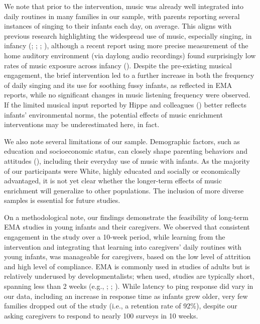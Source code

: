 \documentclass[
]{article}
\begin{document}
We note that prior to the intervention, music was already well
integrated into daily routines in many families in our sample, with
parents reporting several instances of singing to their infants each
day, on average. This aligns with previous research highlighting the
widespread use of music, especially singing, in infancy
(;
;
;
), although a recent report using
more precise measurement of the home auditory environment (via daylong
audio recordings) found surprisingly low rates of music exposure across
infancy (). Despite the
pre-existing musical engagement, the brief intervention led to a further
increase in both the frequency of daily singing and its use for soothing
fussy infants, as reflected in EMA reports, while no significant changes
in music listening frequency were observed. If the limited musical input
reported by Hippe and colleagues () better
reflects infants' environmental norms, the potential effects of music
enrichment interventions may be underestimated here, in fact.

We also note several limitations of our sample. Demographic factors,
such as education and socioeconomic status, can closely shape parenting
behaviors and attitudes (), including their everyday use of music with infants. As the
majority of our participants were White, highly educated and socially or
economically advantaged, it is not yet clear whether the longer-term
effects of music enrichment will generalize to other populations. The
inclusion of more diverse samples is essential for future studies.

On a methodological note, our findings demonstrate the feasibility of
long-term EMA studies in young infants and their caregivers. We observed
that consistent engagement in the study over a 10-week period, while
learning from the intervention and integrating that learning into
caregivers' daily routines with young infants, was manageable for
caregivers, based on the low level of attrition and high level of
compliance. EMA is commonly used in studies of adults but is relatively
underused by developmentalists; when used, studies are typically short,
spanning less than 2 weeks (e.g., ; ;
). While latency to ping
response did vary in our data, including an increase in response time as
infants grew older, very few families dropped out of the study (i.e., a
retention rate of 92\%), despite our asking caregivers to respond to
nearly 100 surveys in 10 weeks.
\end{document}
